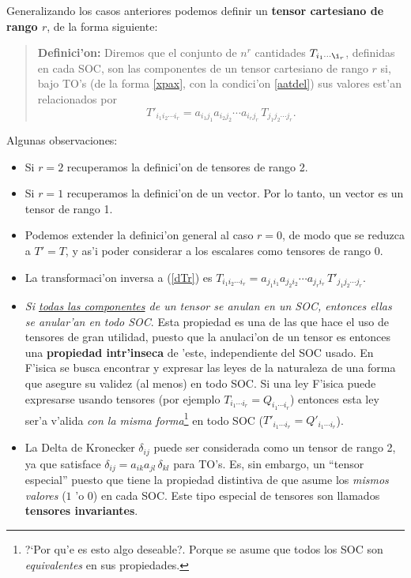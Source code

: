 Generalizando los casos anteriores podemos definir un \textbf{tensor cartesiano de rango $r$}, de la forma siguiente:
\begin{quotation}
\textbf{Definici'on:} Diremos que el conjunto de $n^r$ cantidades $T_{i_1\cdots\i_r}$, definidas en cada SOC, son las componentes de un tensor cartesiano de rango $r$ si, bajo TO's (de la forma \eqref{xpax}, con la condici'on \eqref{aatdel}) sus valores est'an relacionados por 
\begin{equation}\label{dTr}
\boxed{T'_{i_1i_2\cdots i_r}=a_{i_1j_1}a_{i_2j_2}\cdots a_{i_rj_r}\,T_{j_1j_2\cdots j_r}.}
\end{equation}
\end{quotation}
Algunas observaciones:
\begin{itemize}
\item Si $r=2$ recuperamos la definici'on de tensores de rango 2. 
\item Si $r=1$ recuperamos la definici'on de un vector. Por lo tanto, un vector es un tensor de rango 1.
\item Podemos extender la definici'on general al caso $r=0$, de modo que se reduzca a $T'=T$, y as'i poder considerar a los escalares como tensores de rango $0$.
\item La transformaci'on inversa a (\ref{dTr}) es $T_{i_1i_2\cdots i_r}=a_{j_1i_1}a_{j_2i_2}\cdots a_{j_ri_r}\,T'_{j_1j_2\cdots j_r}$.
\item \textit{Si \underline{todas las componentes} de un tensor se anulan en un SOC, entonces ellas se anular'an \textit{en todo SOC}}. Esta propiedad es una de las que hace el uso de tensores de gran utilidad, puesto que la anulaci'on de un tensor es entonces una \textbf{propiedad intr'inseca} de 'este, independiente del SOC usado. En F'isica se busca encontrar y expresar las leyes de la naturaleza de una forma que asegure su validez (al menos) en todo SOC. Si una ley F'isica puede expresarse usando tensores (por ejemplo $T_{i_1\cdots i_r}=Q_{i_1\cdots i_r}$) entonces esta ley ser'a v'alida \textit{con la misma forma}\footnote{?`Por qu'e es esto algo deseable?. Porque se asume que todos los SOC son \textit{equivalentes} en sus propiedades.} en todo SOC ($T'_{i_1\cdots i_r}=Q'_{i_1\cdots i_r}$).
\item La Delta de Kronecker $\delta_{ij}$ puede ser considerada como un tensor de rango 2, ya que satisface $\delta_{ij}=a_{ik}a_{jl}\,\delta_{kl}$ para TO's. Es, sin embargo, un ``tensor especial'' puesto que tiene la propiedad distintiva de que asume los \textit{mismos valores} ($1$ 'o $0$) en cada SOC. Este tipo especial de tensores son llamados \textbf{tensores invariantes}.
\end{itemize}

